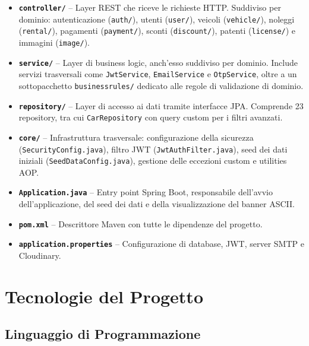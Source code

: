 \documentclass[12pt, a4paper]{article}
\begin{document}
    \begin{itemize}
        \item \textbf{\texttt{controller/}} -- Layer REST che riceve le richieste
        HTTP. Suddiviso per dominio: autenticazione (\texttt{auth/}),
        utenti (\texttt{user/}), veicoli (\texttt{vehicle/}), noleggi
        (\texttt{rental/}), pagamenti (\texttt{payment/}), sconti
        (\texttt{discount/}), patenti (\texttt{license/}) e immagini
        (\texttt{image/}).
        \item \textbf{\texttt{service/}} -- Layer di business logic, anch'esso
        suddiviso per dominio. Include servizi trasversali come
        \texttt{JwtService}, \texttt{EmailService} e \texttt{OtpService},
        oltre a un sottopacchetto \texttt{businessrules/} dedicato alle
        regole di validazione di dominio.
        \item \textbf{\texttt{repository/}} -- Layer di accesso ai dati tramite
        interfacce JPA. Comprende 23 repository, tra cui
        \texttt{CarRepository} con query custom per i filtri avanzati.
        \item \textbf{\texttt{core/}} -- Infrastruttura trasversale: configurazione
        della sicurezza (\texttt{SecurityConfig.java}), filtro JWT
        (\texttt{JwtAuthFilter.java}), seed dei dati iniziali
        (\texttt{SeedDataConfig.java}), gestione delle eccezioni custom e
        utilities AOP.
        \item \textbf{\texttt{Application.java}} -- Entry point Spring Boot,
        responsabile dell'avvio dell'applicazione, del seed dei dati e
        della visualizzazione del banner ASCII.
        \item \textbf{\texttt{pom.xml}} -- Descrittore Maven con tutte le
        dipendenze del progetto.
        \item \textbf{\texttt{application.properties}} -- Configurazione di
        database, JWT, server SMTP e Cloudinary.
    \end{itemize}

    \section{Tecnologie del Progetto}



    \subsection{Linguaggio di Programmazione}
\end{document}

